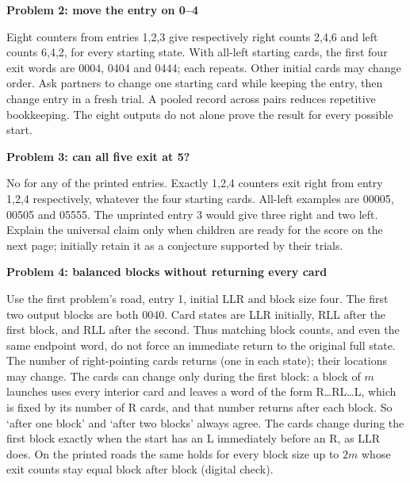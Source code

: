 \documentclass[11pt]{article}
\newcommand{\prob}[1]{\vspace{3pt}\textbf{#1}\par}
\begin{document}
\prob{Problem 2: move the entry on 0--4}
Eight counters from entries 1,2,3 give respectively right counts 2,4,6 and left counts 6,4,2, for every starting state. With all-left starting cards, the first four exit words are 0004, 0404 and 0444; each repeats. Other initial cards may change order. Ask partners to change one starting card while keeping the entry, then change entry in a fresh trial. A pooled record across pairs reduces repetitive bookkeeping. The eight outputs do not alone prove the result for every possible start.

\prob{Problem 3: can all five exit at 5?}
No for any of the printed entries. Exactly 1,2,4 counters exit right from entry 1,2,4 respectively, whatever the four starting cards. All-left examples are 00005, 00505 and 05555. The unprinted entry 3 would give three right and two left. Explain the universal claim only when children are ready for the score on the next page; initially retain it as a conjecture supported by their trials.

\prob{Problem 4: balanced blocks without returning every card}
Use the first problem's road, entry 1, initial LLR and block size four. The first two output blocks are both 0040. Card states are LLR initially, RLL after the first block, and RLL after the second. Thus matching block counts, and even the same endpoint word, do not force an immediate return to the original full state. The number of right-pointing cards returns (one in each state); their locations may change. The cards can change only during the first block: a block of $m$ launches uses every interior card and leaves a word of the form R\ldots RL\ldots L, which is fixed by its number of R cards, and that number returns after each block. So `after one block' and `after two blocks' always agree. The cards change during the first block exactly when the start has an L immediately before an R, as LLR does. On the printed roads the same holds for every block size up to $2m$ whose exit counts stay equal block after block (digital check).
\end{document}
